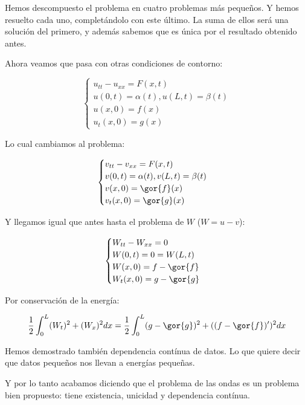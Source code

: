 			Hemos descompuesto el problema en cuatro problemas más pequeños. Y hemos resuelto cada uno, completándolo con este último. La suma de ellos será una solución del primero, y además sabemos que es única por el resultado obtenido antes.

			Ahora veamos que pasa con otras condiciones de contorno:

			\[ \begin{cases}
		 		u_{tt} - u_{xx} = F(x,t)\\
		 		u(0,t) = \alpha(t), u(L,t) = \beta(t) \\
		 		u(x,0) = f(x) \\
		 		u_t(x,0) = g(x)
		 	\end{cases}\]

		 	Lo cual cambiamos al problema:

		 	\[ \begin{cases}
		 		v_{tt} - v_{xx} = F(x,t)\\
		 		v(0,t) = \alpha(t), v(L,t) = \beta(t) \\
		 		v(x,0) = \gor{f}(x) \\
		 		v_t(x,0) = \gor{g}(x)
		 	\end{cases}\]

		 	Y llegamos igual que antes hasta el problema de $W$ ($W = u-v$):

		 	\[ \begin{cases}
		 		W_{tt} - W_{xx} = 0\\
		 		W(0,t) = 0 = W(L,t) \\
		 		W(x,0) = f - \gor{f} \\
		 		W_t(x,0) = g-  \gor{g}
		 	\end{cases}\]

		 	Por conservación de la energía:

		 	\[ \frac{1}{2} \int_0^L (W_t)^2 + (W_x)^2 dx = \frac{1}{2} \int_0^L (g-\gor{g})^2 + ((f-\gor{f})')^2 dx \]

		 	Hemos demostrado también dependencia contínua de datos. Lo que quiere decir que datos pequeños nos llevan a energías pequeñas.

		 	Y por lo tanto acabamos diciendo que el problema de las ondas es un problema bien propuesto: tiene existencia, unicidad y dependencia contínua.






